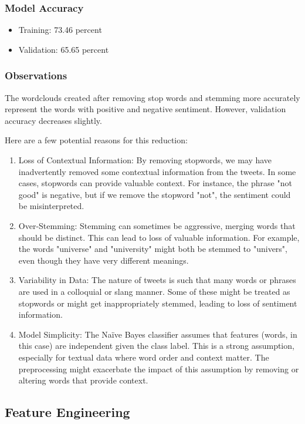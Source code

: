 \documentclass[12pt,a4paper]{article}
\begin{document}
\subsubsection{Model Accuracy}
\begin{itemize}
    \item Training: 73.46 percent
    \item Validation: 65.65 percent
\end{itemize}

\subsubsection{Observations}
The wordclouds created after removing stop words and stemming more accurately represent the words with positive and negative sentiment. However, validation accuracy decreases slightly. 

Here are a few potential reasons for this reduction:

\begin{enumerate}
	\item Loss of Contextual Information: By removing stopwords, we may have inadvertently removed some contextual information from the tweets. In some cases, stopwords can provide valuable context. For instance, the phrase "not good" is negative, but if we remove the stopword "not", the sentiment could be misinterpreted.
	\item Over-Stemming: Stemming can sometimes be aggressive, merging words that should be distinct. This can lead to loss of valuable information. For example, the words "universe" and "university" might both be stemmed to "univers", even though they have very different meanings.
	\item Variability in Data: The nature of tweets is such that many words or phrases are used in a colloquial or slang manner. Some of these might be treated as stopwords or might get inappropriately stemmed, leading to loss of sentiment information.
	\item Model Simplicity: The Naïve Bayes classifier assumes that features (words, in this case) are independent given the class label. This is a strong assumption, especially for textual data where word order and context matter. The preprocessing might exacerbate the impact of this assumption by removing or altering words that provide context.
\end{enumerate}


\subsection{Feature Engineering}
\end{document}

